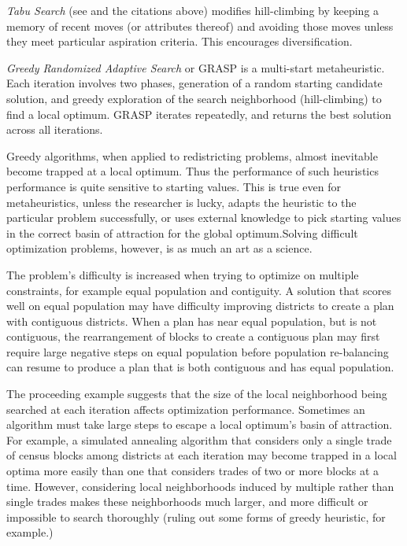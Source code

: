 \documentclass[article]{JSSstyle/jss}
\begin{document}
\emph{Tabu Search} (see \citet{Glover86} and the citations above) modifies hill-climbing by keeping a memory of recent moves (or attributes thereof) and avoiding those moves unless they meet particular aspiration criteria. This encourages diversification.

\emph{Greedy Randomized Adaptive Search} or GRASP \citep{FeoRes89} is a multi-start metaheuristic. Each iteration 
involves two phases, generation of a random starting candidate solution, and greedy exploration of 
the search neighborhood (hill-climbing) to find a local optimum. GRASP iterates repeatedly, and 
returns the best solution across all iterations. 

Greedy algorithms, when applied to redistricting problems, almost inevitable become trapped at a local optimum. Thus the performance of such heuristics 
performance is quite sensitive to starting values. This is true even for 
metaheuristics, unless the researcher is lucky, adapts the heuristic to the particular problem successfully, or uses external knowledge to pick starting values in the correct basin of attraction for the global optimum.Solving difficult optimization problems, however, is as much an art as a science.   

The problem's difficulty  is increased when trying to optimize on multiple constraints, for 
example equal population and contiguity.  A solution that scores well on equal population may 
have difficulty improving districts to create a plan with contiguous districts.  When a plan has 
near equal population, but is not contiguous, the rearrangement of blocks to create a contiguous plan 
may first require large negative steps on equal population before population re-balancing can resume to
produce a plan that is both contiguous and has equal population.

The proceeding example suggests that the size of the local neighborhood being searched at each iteration affects optimization performance.
Sometimes an algorithm must take large steps to escape a local optimum's basin of attraction. 
For example, a simulated annealing algorithm that considers only a single trade of census blocks among districts at each iteration 
may become trapped in a local optima more easily than one that considers trades of two or more blocks at a time.   However, considering local neighborhoods induced by multiple rather than single trades makes these neighborhoods much larger, and  more difficult or impossible to search thoroughly (ruling out some forms of greedy heuristic, for example.)
	
\end{document}
